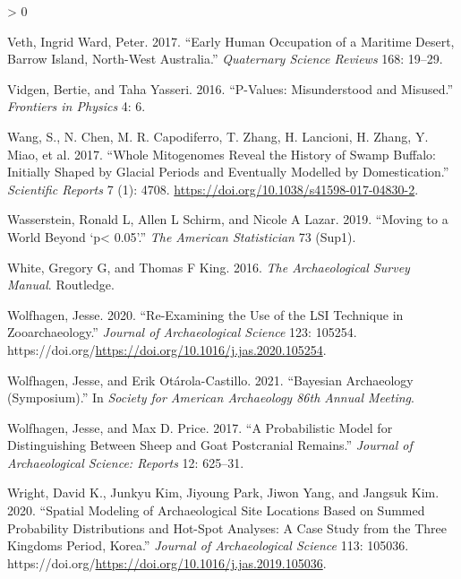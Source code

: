 \documentclass[
]{article}
\newlength{\cslhangindent}
\newenvironment{CSLReferences}[2] %
 {%
  \setlength{\parindent}{0pt}
  \ifodd #1 \everypar{\setlength{\hangindent}{\cslhangindent}}\ignorespaces\fi
  \ifnum #2 > 0
  \setlength{\parskip}{#2\baselineskip}
  \fi
 }%
 {}
\begin{document}
\begin{CSLReferences}{1}{0}
\leavevmode\hypertarget{ref-veth_early_2017}{}%
Veth, Ingrid Ward, Peter. 2017. {``Early Human Occupation of a Maritime
Desert, {Barrow} {Island}, {North}-{West} {Australia}.''}
\emph{Quaternary Science Reviews} 168: 19--29.

\leavevmode\hypertarget{ref-vidgen_p-values_2016}{}%
Vidgen, Bertie, and Taha Yasseri. 2016. {``P-Values: Misunderstood and
Misused.''} \emph{Frontiers in Physics} 4: 6.

\leavevmode\hypertarget{ref-wang_whole_2017}{}%
Wang, S., N. Chen, M. R. Capodiferro, T. Zhang, H. Lancioni, H. Zhang,
Y. Miao, et al. 2017. {``Whole {Mitogenomes} {Reveal} the {History} of
{Swamp} {Buffalo}: {Initially} {Shaped} by {Glacial} {Periods} and
{Eventually} {Modelled} by {Domestication}.''} \emph{Scientific Reports}
7 (1): 4708. \url{https://doi.org/10.1038/s41598-017-04830-2}.

\leavevmode\hypertarget{ref-wasserstein_moving_2019}{}%
Wasserstein, Ronald L, Allen L Schirm, and Nicole A Lazar. 2019.
{``Moving to a World Beyond {`p\textless{} 0.05'}.''} \emph{The American
Statistician} 73 (Sup1).

\leavevmode\hypertarget{ref-white_archaeological_2016}{}%
White, Gregory G, and Thomas F King. 2016. \emph{The Archaeological
Survey Manual}. Routledge.

\leavevmode\hypertarget{ref-wolfhagen_re-examining_2020}{}%
Wolfhagen, Jesse. 2020. {``Re-Examining the Use of the {LSI} Technique
in Zooarchaeology.''} \emph{Journal of Archaeological Science} 123:
105254. https://doi.org/\url{https://doi.org/10.1016/j.jas.2020.105254}.

\leavevmode\hypertarget{ref-wolfhagen_bayesian_2021}{}%
Wolfhagen, Jesse, and Erik Otárola-Castillo. 2021. {``Bayesian
{Archaeology} ({Symposium}).''} In \emph{Society for {American}
{Archaeology} 86th {Annual} {Meeting}}.

\leavevmode\hypertarget{ref-wolfhagen_probabilistic_2017}{}%
Wolfhagen, Jesse, and Max D. Price. 2017. {``A Probabilistic Model for
Distinguishing Between Sheep and Goat Postcranial Remains.''}
\emph{Journal of Archaeological Science: Reports} 12: 625--31.

\leavevmode\hypertarget{ref-wright_spatial_2020}{}%
Wright, David K., Junkyu Kim, Jiyoung Park, Jiwon Yang, and Jangsuk Kim.
2020. {``Spatial Modeling of Archaeological Site Locations Based on
Summed Probability Distributions and Hot-Spot Analyses: {A} Case Study
from the {Three} {Kingdoms} {Period}, {Korea}.''} \emph{Journal of
Archaeological Science} 113: 105036.
https://doi.org/\url{https://doi.org/10.1016/j.jas.2019.105036}.


\end{CSLReferences}
\end{document}
